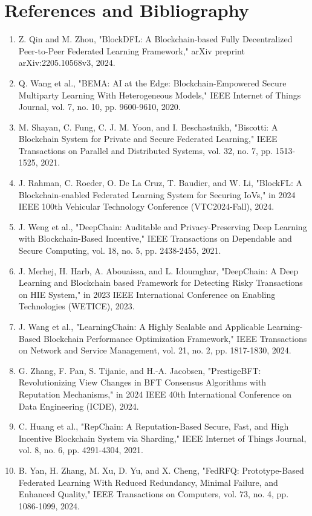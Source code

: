 \documentclass[12pt,a4paper]{article}
\begin{document}
\section{References and Bibliography}
\begin{enumerate}
    \item Z. Qin and M. Zhou, "BlockDFL: A Blockchain-based Fully Decentralized Peer-to-Peer Federated Learning Framework," arXiv preprint arXiv:2205.10568v3, 2024.
    \item Q. Wang et al., "BEMA: AI at the Edge: Blockchain-Empowered Secure Multiparty Learning With Heterogeneous Models," IEEE Internet of Things Journal, vol. 7, no. 10, pp. 9600-9610, 2020.
    \item M. Shayan, C. Fung, C. J. M. Yoon, and I. Beschastnikh, "Biscotti: A Blockchain System for Private and Secure Federated Learning," IEEE Transactions on Parallel and Distributed Systems, vol. 32, no. 7, pp. 1513-1525, 2021.
    \item J. Rahman, C. Roeder, O. De La Cruz, T. Baudier, and W. Li, "BlockFL: A Blockchain-enabled Federated Learning System for Securing IoVs," in 2024 IEEE 100th Vehicular Technology Conference (VTC2024-Fall), 2024.
    \item J. Weng et al., "DeepChain: Auditable and Privacy-Preserving Deep Learning with Blockchain-Based Incentive," IEEE Transactions on Dependable and Secure Computing, vol. 18, no. 5, pp. 2438-2455, 2021.
    \item J. Merhej, H. Harb, A. Abouaissa, and L. Idoumghar, "DeepChain: A Deep Learning and Blockchain based Framework for Detecting Risky Transactions on HIE System," in 2023 IEEE International Conference on Enabling Technologies (WETICE), 2023.
    \item J. Wang et al., "LearningChain: A Highly Scalable and Applicable Learning-Based Blockchain Performance Optimization Framework," IEEE Transactions on Network and Service Management, vol. 21, no. 2, pp. 1817-1830, 2024.
    \item G. Zhang, F. Pan, S. Tijanic, and H.-A. Jacobsen, "PrestigeBFT: Revolutionizing View Changes in BFT Consensus Algorithms with Reputation Mechanisms," in 2024 IEEE 40th International Conference on Data Engineering (ICDE), 2024.
    \item C. Huang et al., "RepChain: A Reputation-Based Secure, Fast, and High Incentive Blockchain System via Sharding," IEEE Internet of Things Journal, vol. 8, no. 6, pp. 4291-4304, 2021.
    \item B. Yan, H. Zhang, M. Xu, D. Yu, and X. Cheng, "FedRFQ: Prototype-Based Federated Learning With Reduced Redundancy, Minimal Failure, and Enhanced Quality," IEEE Transactions on Computers, vol. 73, no. 4, pp. 1086-1099, 2024.
\end{enumerate}
\end{document}
